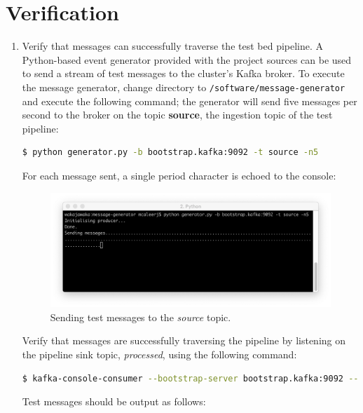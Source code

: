 \section{Verification}
 
 \begin{enumerate}

  \item Verify that messages can successfully traverse the test bed pipeline. A Python-based event generator provided with the project sources can be used to send a stream of test messages to the cluster's Kafka broker. To execute the message generator, change directory to \texttt{/software/message-generator} and execute the following command; the generator will send five messages per second to the broker on the topic \textbf{source}, the ingestion topic of the test pipeline:
  
  \begin{lstlisting}[language=bash]
  $ python generator.py -b bootstrap.kafka:9092 -t source -n5
  \end{lstlisting}

For each message sent, a single period character is echoed to the console:
 
  \begin{figure}[H]
 	\centering  
 	\includegraphics[width=\linewidth]{figures/appendixA/testbed-send-messages.png}
 	\caption{Sending test messages to the \textit{source} topic.}
 \end{figure}

Verify that messages are successfully traversing the pipeline by listening on the pipeline sink topic, \textit{processed}, using the following command:

  \begin{lstlisting}[language=bash]
$ kafka-console-consumer --bootstrap-server bootstrap.kafka:9092 --topic processed
\end{lstlisting}

 Test messages should be output as follows:
 

\end{enumerate}
